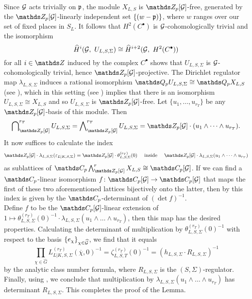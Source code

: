 \documentclass[a4paper, 
headsepline=off, DIV=12, titlepage=false]{scrartcl}
\begin{document}
\begin{proofbox}
Since $\mathcal{G}$ acts trivially on $\mathfrak{p}$, the module $X_{L, S}$ is $\Z_p [\cG]$-free, generated by the $\Z_p [\cG]$-linearly independent set $\{ (w - \mathfrak{p}) \}$, where $w$ ranges over our set of fixed places in $S_L$. It follows that $H^2 (C^\bullet)$ is $\mathcal{G}$-cohomologically trivial and the isomorphism
\[
\widehat{H}^i (\mathcal{G}, \ U_{L, S, \Sigma})\cong \widehat{H}^{i + 2} ( \mathcal{G}, \ H^2 (C^\bullet))
\]
for all $i \in \Z$ induced by the complex $C^\bullet$ shows that $U_{L,S, \Sigma }$ is $\mathcal{G}$-cohomologically trivial, hence $\Z_p [\cG]$-projective. The Dirichlet regulator map $\lambda_{L, S, \Sigma}$ induces a rational isomorphism $\Q_p U_{L, S, \Sigma} \cong \Q_p X_{L, S}$ (see \cite[\S I.4.3]{Tate}), which in this setting (see \cite[Thm.\@ 5.6.10 (ii)]{NSW}) implies that there is an isomorphism $U_{L, S, \Sigma} \cong X_{L, S}$ and so $U_{L,S,\Sigma}$ is $\ZZ_p[\cG]$-free. Let $\{u_1, \dots, u_{r_T}\}$ be any $\ZZ_p[\cG]$-basis of this module. Then 
\[
\bidual^{r_T}_{\Z_p [\cG]} U_{L, S, \Sigma} = \exprod^{r_T}_{\Z_p [\cG]} U_{L, S, \Sigma} = \Z_p [\cG] \cdot (u_1 \wedge \dots \wedge u_{r_T}).
\]
It now suffices to calculate the index  
\[
\Z_p [\cG] \cdot \lambda_{L, S, \Sigma} ( \varepsilon_{L | K, S, \Sigma}) = \Z_p [\cG] \cdot \theta^{(r_T)}_{L, S, \Sigma} (0) 
\quad\text{ inside } \quad
\Z_p [\cG] \cdot \lambda_{L, S, \Sigma} ( u_1 \wedge \dots \wedge u_{r_T}) 
\]
as sublattices of $\C_p \exprod_{\Z_p [\cG]}^r X_{L, S} \cong \C_p [\cG]$. If we can find a $\C_p$-linear isomorphism $f \: \C_p [\cG] \to \C_p [\cG]$ that maps the first of these two aforementioned lattices bijectively onto the latter, then by \cite[Lem. 1.1 (b)]{Sinnott} this index is given by the $\C_p$-determinant of $(\det f)^{-1}$. \\

Define $f$ to be the $\C_p [\cG]$-linear extension of $1 \mapsto \theta^{(r_T)}_{L, S, \Sigma} (0)^{-1} \cdot  \lambda_{L, S, \Sigma} ( u_1 \wedge \dots \wedge u_{r_T})$, then this map has the desired properties. Calculating the determinant of multiplication by $\theta^{(r_T)}_{L, S, \Sigma} (0)^{-1}$ with respect to the basis $\{ e_\chi \}_{\chi\in \widehat{\mathcal{G}}}$, we find that it equals
\[ \prod_{\chi \in \widehat{G}} L^{(r_T)}_{L | K, S, \Sigma} (\overline{\chi}, 0)^{-1} = \zeta_{L, S, T}^{(r_T)} (0)^{-1} = (h_{L, S, \Sigma}\cdot R_{L, S, \Sigma})^{-1}
\]
by the analytic class number formula, where $R_{L,S,\Sigma}$ is the $(S,\Sigma)$-regulator. Finally, using \cite[Ch. III, \S 9.4, Prop. 6]{Bourbaki}, we conclude that multiplication by $\lambda_{L, S, \Sigma} ( u_1 \wedge \dots \wedge u_{r_T})$ has determinant $R_{L, S, \Sigma}$. This completes the proof of the Lemma.
\end{proofbox}
\end{document}

